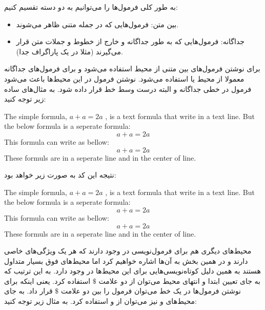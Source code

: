 به طور کلی فرمول‌ها را می‌توانیم به دو دسته تقسیم کنیم:

\begin{itemize}
  \item بین متن: فرمول‌هایی که در جمله متنی ظاهر می‌شوند.
  \item جداگانه: فرمول‌هایی که به طور جداگانه و خارج از خطوط و جملات متن قرار
  می‌گیرند (مثلا در یک پاراگراف جدا).
\end{itemize}

برای نوشتن فرمول‌های بین متنی از محیط  استفاده می‌شود و برای فرمول‌های
جداگانه معمولا از محیط  یا  استفاده می‌شود.
نوشتن فرمول در این محیط‌ها باعث می‌شود فرمول در خطی جداگانه و البته درست وسط
خط قرار داده شود. به مثال‌های ساده زیر توجه کنید:

\begin{latex}
The simple formula,
\begin{math}
a+a=2a
\end{math}
, is a text formula that write
in a text line. But the below formula is a seperate formula:
\begin{displaymath}
a+a=2a
\end{displaymath}
This formula can write as bellow:
\begin{equation*}
a+a=2a
\end{equation*}
These formuls are in a seperate line and in the center of line.
\end{latex}

نتیجه این کد \lr{\LaTeX} به صورت زیر خواهد بود:

\begin{latin}
The simple formula,
\begin{math}
a+a=2a
\end{math}
, is a text formula that write
in a text line. But the below formula is a seperate formula:
\begin{displaymath}
a+a=2a
\end{displaymath}
This formula can write as bellow:
\begin{equation*}
a+a=2a
\end{equation*}
These formuls are in a seperate line and in the center of line.
\end{latin}

محیط‌های دیگری هم برای فرمول‌نویسی در \lr{\LaTeX} وجود دارند که هر یک ویژگی‌های
خاصی دارند و در همین بخش به آن‌ها اشاره خواهیم کرد اما محیط‌های فوق بسیار متداول
هستند به همین دلیل کوتاه‌نویسی‌هایی برای این محیط‌ها در \lr{\LaTeX} وجود دارد.
به این ترتیب که به جای تعیین ابتدا و انتهای محیط  می‌توان از دو علامت
$\$$ استفاده کرد. یعنی اینکه برای نوشتن فرمول‌ها در یک خط می‌توان فرمول را بین
دو علامت $\$$ قرار داد. به جای محیط‌های  و  نیز
می‌توان از \lr{\textbackslash [} و \lr{\textbackslash ]} استفاده کرد. به مثال
زیر توجه کنید:

